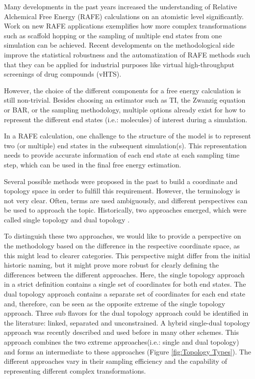 
Many developments in the past years increased the understanding of Relative Alchemical Free Energy (RAFE) calculations on an atomistic level significantly. Work on new RAFE applications exemplifies how more complex transformations such as scaffold hopping or the sampling of multiple end states from one simulation can be achieved. \cite{knight2011, Wang2017}
Recent developments on the methodological side improve the statistical robustness and the automatization of RAFE methods such that they can be applied for industrial purposes like virtual high-throughput screenings of drug compounds (vHTS). \cite{Cournia2017, Stroet2018, Jespers2019, Heinzelmann2021}

However, the choice of the different components for a free energy calculation is still non-trivial. Besides choosing an estimator such as  TI, the Zwanzig equation or BAR, or the sampling methodology, multiple options already exist for how to represent the different end states (i.e.: molecules) of interest during a simulation. \cite{Zwanzig1954, Kirkwood1935, Bennett1976}

In a RAFE calculation, one challenge to the structure of the model is to represent two (or multiple) end states in the subsequent simulation(s). This representation needs to provide accurate information of each end state at each sampling time step, which can be used in the final free energy estimation. 

Several possible methods were proposed in the past to build a coordinate and topology space in order to fulfill this requirement. 
However, the terminology is not very clear. Often, terms are used ambiguously, and different perspectives can be used to approach the topic. \cite{Boresch1999, Rocklin2013, Fleck2021} 
Historically, two approaches emerged, which were called single topology \cite{Pearlman1991, Pearlman1994, Hansen2013, Wang2017} and dual topology \cite{Pearlman1991, Gao1989, Sidler2016}.

To distinguish these two approaches, we would like to provide a perspective on the methodology based on the difference in the respective coordinate space, as this might lead to clearer categories. This perspective might differ from the initial historic naming, but it might prove more robust for clearly defining the differences between the different approaches. Here, the single topology approach in a strict definition contains a single set of coordinates for both end states. The dual topology approach contains a separate set of coordinates for each end state and, therefore, can be seen as the opposite extreme of the single topology approach. Three sub flavors for the dual topology approach could be identified in the literature: linked, separated and unconstrained.
A  hybrid single-dual topology approach was recently described \cite{Jiang2019} and used before in many other schemes. This approach combines the two extreme approaches(i.e.: single and dual topology) and forms an intermediate to these approaches (Figure \ref{fig:Topology Types}). The different approaches vary in their sampling efficiency and the capability of representing different complex transformations.


